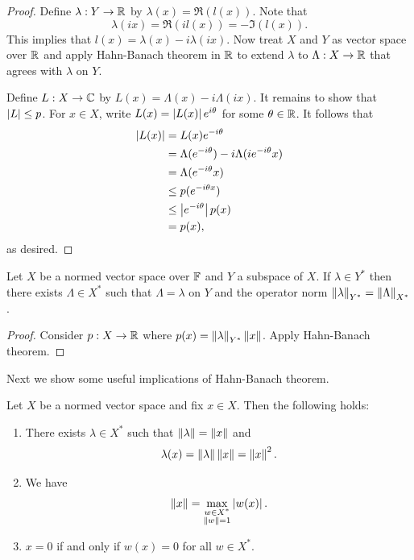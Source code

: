 \documentclass[a4paper]{article}
\begin{document}
\begin{proof}

Define $\lambda: Y \to \mathbb{R}$ by $\lambda(x) = \Re(l(x))$.
Note that
\[
\lambda(i x) = \Re(i l(x)) = - \Im(l (x)).
\]
This implies that $l(x) = \lambda(x) - i \lambda(i x)$.
Now treat $X$ and $Y$ as vector space over $\mathbb{R}$ and apply Hahn-Banach
theorem in $\mathbb{R}$ to extend $\lambda$ to $\Lambda : X \to \mathbb{R}$
that agrees with $\lambda$ on $Y$.

Define $L: X \to \mathbb{C}$ by $L(x) = \Lambda(x) - i \Lambda(i x)$.
It remains to show that $\left\lvert L\right\rvert \leq p$. For $x \in X$,
write $L(x) = \left\lvert L(x)\right\rvert e^{i \theta}$ for some $\theta \in \mathbb{R}$.
It follows that
\[
\begin{aligned}
  \left\lvert L(x)\right\rvert
  &= L(x) e^{- i \theta} \\
  &= \Lambda(e^{- i \theta}) - i \Lambda(i e^{- i \theta} x) \\
  &= \Lambda(e^{- i \theta} x) \\
  &\leq p(e^{- i \theta x}) \\
  &\leq \left\lvert e^{- i \theta}\right\rvert p(x) \\
  &= p(x),
\end{aligned}
\]
as desired.

\end{proof}

\begin{thm}
Let $X$ be a normed vector space over $\mathbb{F}$ and $Y$ a subspace
of $X$. If $\lambda \in Y^*$ then there exists
$\Lambda \in X^*$ such that $\Lambda = \lambda$ on $Y$ and
the operator norm
$\left\lVert \lambda\right\rVert_{Y^*} = \left\lVert \Lambda\right\rVert_{X^*}$.
\end{thm}

\begin{proof}

Consider $p: X \to \mathbb{R}$ where $p(x) = \left\lVert \lambda\right\rVert_{Y^*} \left\lVert x\right\rVert$.
Apply Hahn-Banach theorem.

\end{proof}

Next we show some useful implications of Hahn-Banach theorem.

\begin{thm}
Let $X$ be a normed vector space and fix $x \in X$. Then
the following holds:
\begin{enumerate}
  \item There exists $\lambda \in X^*$ such that
  $\left\lVert \lambda\right\rVert = \left\lVert x\right\rVert$ and
  \[
  \lambda(x) = \left\lVert \lambda\right\rVert \left\lVert x\right\rVert = \left\lVert x\right\rVert^2.
  \]
  \item We have
  \[
  \left\lVert x\right\rVert = \max_{\substack{w \in X^* \\ \left\lVert w\right\rVert = 1}}
  \left\lvert w(x)\right\rvert.
  \]
  \item $x = 0$ if and only if $w(x) = 0$ for all $w \in X^*$.
\end{enumerate}
\end{thm}
\end{document}
